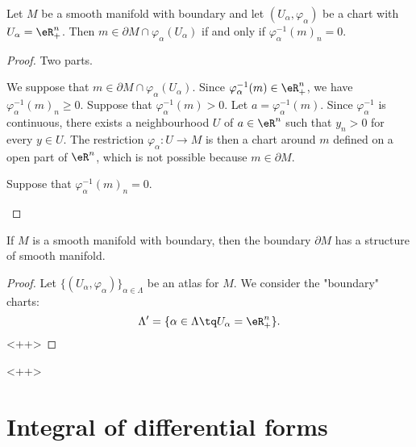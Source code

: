 \begin{proposition}	\label{PROPooWQHTooXhkWdZ}
	Let \( M\) be a smooth manifold with boundary and let \( (U_{\alpha}, \varphi_{\alpha})\) be a chart with \( U_{\alpha}=\eR^n_+\). Then \( m\in \partial M\cap \varphi_{\alpha}(U_{\alpha})\) if and only if \( \varphi_{\alpha}^{-1}(m)_n=0\).
\end{proposition}

\begin{proof}
	Two parts.
	\begin{subproof}
		\spitem[\( \Rightarrow\)]
		We suppose that \( m\in \partial M\cap \varphi_{\alpha}(U_{\alpha})\). Since \( \varphi_{\alpha}^{-1}(m)\in \eR^n_+\), we have \( \varphi_{\alpha}^{-1}(m)_n\geq 0\). Suppose that \( \varphi_{\alpha}^{-1}(m)>0\). Let \( a=\varphi_{\alpha}^{-1}(m)\). Since \( \varphi_{\alpha}^{-1}\) is continuous, there exists a neighbourhood \( U\) of \(a\in \eR^n \) such that \( y_n>0\) for every \( y\in U\). The restriction \(\varphi_{\alpha} \colon U\to M  \) is then a chart around \( m\) defined on a open part of \( \eR^n\), which is not possible because \( m\in\partial M\).

		\spitem[\( \Leftarrow\)]
		Suppose that \( \varphi_{\alpha}^{-1}(m)_n=0\).
	\end{subproof}
\end{proof}

\begin{proposition}	\label{PROPooTENAooDxIAbf}
	If \( M\) is a smooth manifold with boundary, then the boundary \( \partial M\) has a structure of smooth manifold.
\end{proposition}

\begin{proof}
	Let \( \{ (U_{\alpha}, \varphi_{\alpha}) \}_{\alpha\in \Lambda}\) be an atlas for \( M\). We consider the "boundary" charts:
	\begin{equation}
		\Lambda'=\{ \alpha\in\Lambda\tq U_{\alpha}=\eR^n_+ \}.
	\end{equation}<++>
\end{proof}<++>

\section{Integral of differential forms}



